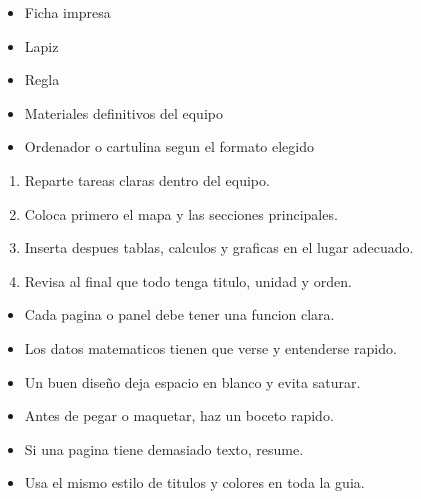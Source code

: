\documentclass[12pt,a4paper]{article}
\begin{document}
        \FichaCabecera

        \begin{materialesbox}
        \begin{itemize}
    \item Ficha impresa
    \item Lapiz
    \item Regla
    \item Materiales definitivos del equipo
    \item Ordenador o cartulina segun el formato elegido
\end{itemize}
        \end{materialesbox}

        \begin{pasosbox}
        \begin{enumerate}
    \item Reparte tareas claras dentro del equipo.
    \item Coloca primero el mapa y las secciones principales.
    \item Inserta despues tablas, calculos y graficas en el lugar adecuado.
    \item Revisa al final que todo tenga titulo, unidad y orden.
\end{enumerate}
        \end{pasosbox}

        \begin{recordatoriobox}
        \begin{itemize}
    \item Cada pagina o panel debe tener una funcion clara.
    \item Los datos matematicos tienen que verse y entenderse rapido.
    \item Un buen diseño deja espacio en blanco y evita saturar.
\end{itemize}
        \end{recordatoriobox}

        \begin{apoyobox}
        \begin{itemize}
    \item Antes de pegar o maquetar, haz un boceto rapido.
    \item Si una pagina tiene demasiado texto, resume.
    \item Usa el mismo estilo de titulos y colores en toda la guia.
\end{itemize}
        \end{apoyobox}
\end{document}
